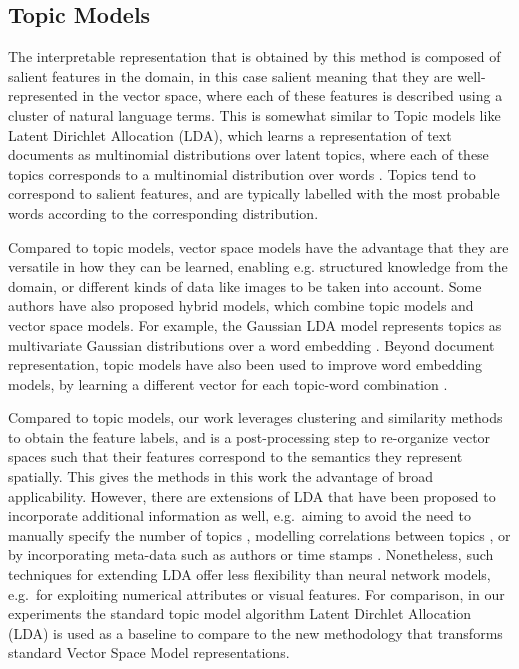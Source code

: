 \subsection{Topic Models}\label{bg:TopicModels}

The interpretable representation that is obtained by this method is composed of salient features in the domain, in this case salient meaning that they are well-represented in the vector space, where each of these features is described using a cluster of natural language terms. This is somewhat similar to Topic models like Latent Dirichlet Allocation (LDA), which learns a representation of text documents as multinomial distributions over latent topics, where each of these topics corresponds to a multinomial distribution over words \cite{Blei03latentdirichlet}.  Topics tend to correspond to salient features, and are typically labelled with the most probable words according to the corresponding distribution. 

Compared to topic models, vector space models have the advantage that they are versatile in how they can be learned, enabling e.g. structured knowledge from the domain, or different kinds of data like images to be taken into account. Some authors have also proposed hybrid models, which combine topic models and vector space models. For example, the Gaussian LDA model represents topics as multivariate Gaussian distributions over a word embedding \cite{DBLP:conf/acl/DasZD15}. Beyond document representation, topic models have also been used to improve word embedding models, by learning a different vector for each topic-word combination \cite{DBLP:conf/aaai/LiuLCS15}.

Compared to topic models, our work leverages clustering and similarity methods to obtain the feature labels, and is a post-processing step to re-organize vector spaces such that their features correspond to the semantics they represent spatially. This gives the methods in this work the advantage of broad applicability. However, there are extensions of LDA that have been proposed to incorporate additional information as well, e.g.\ aiming to avoid the need to manually specify the number of topics \cite{teh2005sharing}, modelling correlations between topics \cite{Blei2006}, or by incorporating meta-data such as authors or time stamps \cite{rosen2004author,wang2006topics}. Nonetheless, such techniques for extending LDA offer less flexibility than neural network models, e.g.\ for exploiting numerical attributes or visual features. For comparison, in our experiments the standard topic model algorithm Latent Dirchlet Allocation (LDA) is used as a baseline to  compare to the new methodology that transforms standard Vector Space Model representations. 

